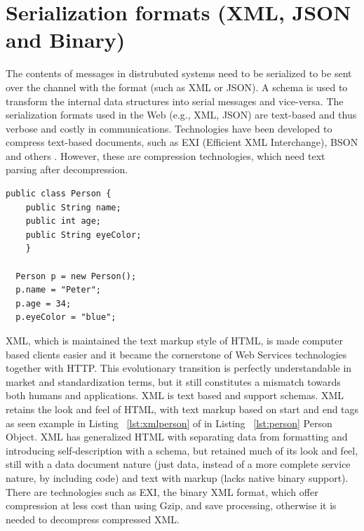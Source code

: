 \section{Serialization formats (XML, JSON and Binary)}
\label{section:xml}
The contents of messages in distrubuted systems need to be serialized to be sent over the channel with the format (such as XML or JSON). A schema is used to transform the internal data structures into serial messages and vice-versa. The serialization formats used in the Web (e.g., XML, JSON) are text-based and thus verbose and costly in communications. Technologies have been developed to compress text-based documents\citep{thesis:state5_3}, such as EXI (Efficient XML Interchange), BSON and others \citep{thesis:state5_4}. However, these are compression technologies, which need text parsing after decompression.
\begin{lstlisting}[caption=Example Person Object Class, label=lst:person]
  public class Person {
    public String name;
    public int age;
    public String eyeColor;
    }

  Person p = new Person();
  p.name = "Peter";
  p.age = 34;
  p.eyeColor = "blue";
\end{lstlisting}

XML, which is maintained the text markup style of HTML, is made computer based clients easier and it became the cornerstone of Web Services technologies together with HTTP. This evolutionary transition is perfectly understandable in market and standardization terms, but it still constitutes a mismatch towards both humans and applications. XML is text based and support schemas. XML retains the look and feel of HTML, with text markup based on start and end tags as seen example in Listing ~\ref{lst:xmlperson} of in Listing ~\ref{lst:person} Person Object. XML has generalized HTML with separating data from formatting and introducing self-description with a schema, but retained much of its look and feel, still with a data document nature (just data, instead of a more complete service nature, by including code) and text with markup (lacks native binary support). There are technologies such as  EXI, the binary XML format, which offer compression at less cost than using Gzip, and save processing, otherwise it is needed to decompress compressed XML\citep{thesis:state9}.

